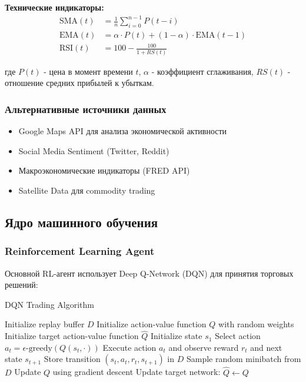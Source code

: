 \documentclass[12pt,a4paper]{article}
\begin{document}
\textbf{Технические индикаторы:}
\begin{align}
\text{SMA}(t) &= \frac{1}{n}\sum_{i=0}^{n-1} P(t-i) \\
\text{EMA}(t) &= \alpha \cdot P(t) + (1-\alpha) \cdot \text{EMA}(t-1) \\
\text{RSI}(t) &= 100 - \frac{100}{1 + RS(t)}
\end{align}

где $P(t)$ - цена в момент времени $t$, $\alpha$ - коэффициент сглаживания, $RS(t)$ - отношение средних прибылей к убыткам.

\subsubsection{Альтернативные источники данных}
\begin{itemize}
    \item Google Maps API для анализа экономической активности
    \item Social Media Sentiment (Twitter, Reddit)
    \item Макроэкономические индикаторы (FRED API)
    \item Satellite Data для commodity trading
\end{itemize}

\subsection{Ядро машинного обучения}

\subsubsection{Reinforcement Learning Agent}

Основной RL-агент использует Deep Q-Network (DQN) для принятия торговых решений:

\begin{algorithm}
\caption{DQN Trading Algorithm}
\begin{algorithmic}[1]
\STATE Initialize replay buffer $D$
\STATE Initialize action-value function $Q$ with random weights
\STATE Initialize target action-value function $\hat{Q}$
    \STATE Initialize state $s_1$
        \STATE Select action $a_t = \epsilon\text{-greedy}(Q(s_t, \cdot))$
        \STATE Execute action $a_t$ and observe reward $r_t$ and next state $s_{t+1}$
        \STATE Store transition $(s_t, a_t, r_t, s_{t+1})$ in $D$
        \STATE Sample random minibatch from $D$
        \STATE Update $Q$ using gradient descent
            \STATE Update target network: $\hat{Q} \leftarrow Q$
        \ENDIF
    \ENDFOR
\ENDFOR
\end{algorithmic}
\end{algorithm}
\end{document}
